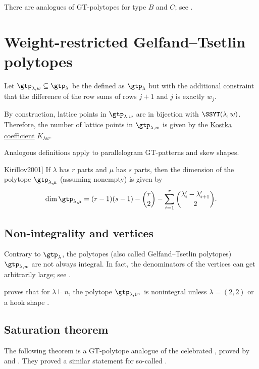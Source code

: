 There are analogues of GT-polytopes for type $B$ and $C$; see
\cite{ArdilaBliemSalazar2011}.


\section[gtKostka]{Weight-restricted Gelfand--Tsetlin polytopes}

Let $\gtp_{\lambda,w}\subseteq \gtp_{\lambda}$ be the
\label{weightRestrictedGTPolytope}
defined as $\gtp_{\lambda}$ but with the additional constraint that the
difference of the row sums of rows $j+1$ and $j$ is exactly $w_j$.

By construction, lattice points in $\gtp_{\lambda,w}$ are in bijection with
$\SSYT(\lambda,w)$.
Therefore, the number of lattice points in $\gtp_{\lambda,w}$ is
given by the \hyperref[schurCombinatorialFormula]{Kostka coefficient} $K_{\lambda w}$.

Analogous definitions apply to parallelogram GT-patterns and skew shapes.


\begin{theorem}[See \cite[p.~179]{Kirillov2001}]
If $\lambda$ has $r$ parts and $\mu$ has $s$ parts, then the dimension of the
polytope $\gtp_{\lambda,\mu}$ (assuming nonempty) is given by
\[
 \dim \gtp_{\lambda,\mu}
 =
 (r-1)(s-1)-\binom{r}{2}
 - \sum_{i=1}^{r} \binom{\lambda'_i-\lambda'_{i+1}}{2}.
\]
\end{theorem}


\subsection[gtKostkaVertices]{Non-integrality and vertices}

Contrary to $\gtp_{\lambda}$, the polytopes (also called
Gelfand--Tsetlin polytopes) $\gtp_{\lambda,w}$ are not always integral.
In fact, the denominators of the vertices can get arbitrarily large; see
\cite{DeLoeraMcAllister2004}.

 proves that for $\lambda \vdash n$, the polytope
$\gtp_{\lambda,1^n}$ is nonintegral unless $\lambda=(2,2)$ or a hook shape
\cite{Alexandersson2016GTPoly}.


\subsection[gtKostkaSaturation]{Saturation theorem}

The following theorem is a GT-polytope analogue of the celebrated
\label{lrSaturationTheorem},
proved by  and 
\cite{KnutsonTau1999,KnutsonTaoWoodward2004}.
They proved a similar statement for so-called
\label{berensteinZelevinskyPolytope}.

